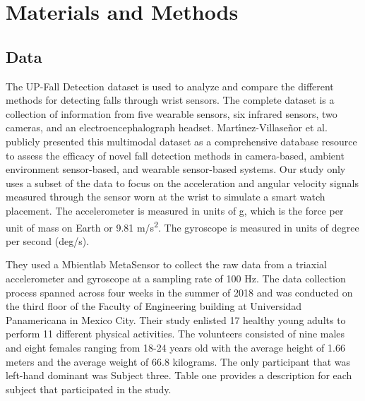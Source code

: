 \documentclass{llncs}
\begin{document}

    
\section{Materials and Methods}

\subsection{Data}

The UP-Fall Detection dataset is used to analyze and compare the different methods for detecting falls through wrist sensors. The complete dataset is a collection of information from five wearable sensors, six infrared sensors, two cameras, and an electroencephalograph headset. Mart{\'\i}nez-Villase{\~n}or et al. publicly presented this multimodal dataset as a comprehensive database resource to assess the efficacy of novel fall detection methods in camera-based, ambient environment sensor-based, and wearable sensor-based systems.\cite{martinez2019up} Our study only uses a subset of the data to focus on the acceleration and angular velocity signals measured through the sensor worn at the wrist to simulate a smart watch placement. The accelerometer is measured in units of g, which is the force per unit of mass on Earth or 9.81 m/s\textsuperscript{2}. The gyroscope is measured in units of degree per second (deg/s).
 
	They used a Mbientlab MetaSensor to collect the raw data from a triaxial accelerometer and gyroscope at a sampling rate of 100 Hz. The data collection process spanned across four weeks in the summer of 2018 and was conducted on the third floor of the Faculty of Engineering building at Universidad Panamericana in Mexico City.\cite{martinez2019up} Their study enlisted 17 healthy young adults to perform 11 different physical activities. The volunteers consisted of nine males and eight females ranging from 18-24 years old with the average height of 1.66 meters and the average weight of 66.8 kilograms. The only participant that was left-hand dominant was Subject three. Table one provides a description for each subject that participated in the study.
	
\end{document}
